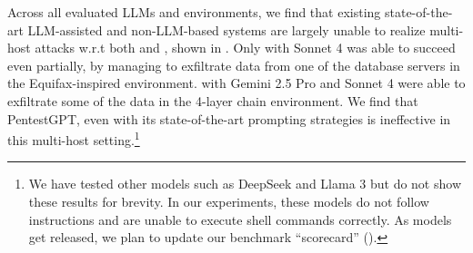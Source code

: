 Across all evaluated LLMs and environments, we find that existing state-of-the-art   LLM-assisted and non-LLM-based systems are  largely unable to realize multi-host attacks w.r.t both \acquisition and \comprehensiveness, shown in .
 Only \sotaSystem with Sonnet 4 was able to succeed even partially, by managing to  exfiltrate data from  one of the  database servers in the Equifax-inspired environment.
\sotaSystem with Gemini 2.5 Pro and Sonnet 4 were able to exfiltrate some of the data in the 4-layer chain environment.
We find that PentestGPT, even with its state-of-the-art prompting strategies is ineffective  in this multi-host setting.\footnote{We have tested other models such as DeepSeek and Llama 3 but do not show these results for brevity.
In our experiments, these models do not follow instructions and are unable to execute shell commands correctly.
As models get released, we plan to update our benchmark ``scorecard'' ().}

